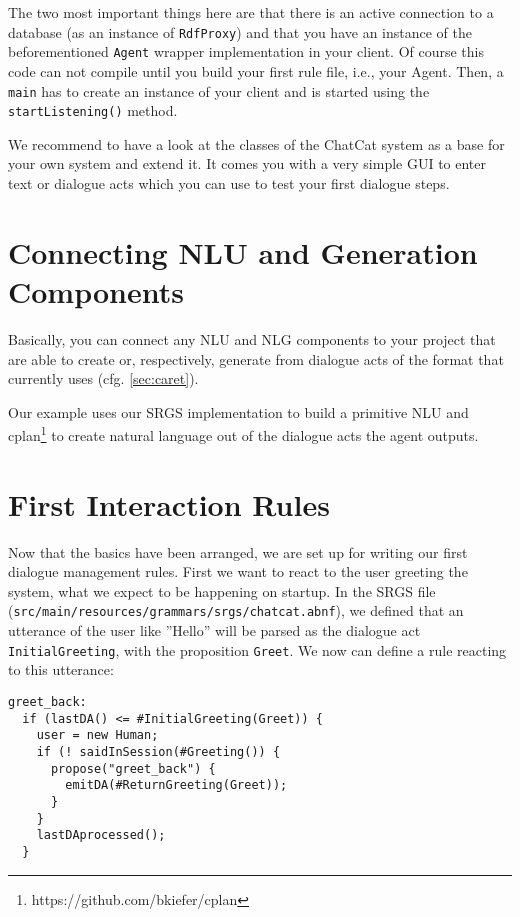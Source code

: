 The two most important things here are that there is an active connection to a
database (as an instance of \texttt{RdfProxy}) and that you have an instance of
the beforementioned \vonda \texttt{Agent} wrapper implementation in your
client. Of course this code can not compile until you build your first rule
file, i.e., your \vonda Agent. Then, a \texttt{main} has to create an instance
of your client and is started using the \texttt{startListening()} method.

We recommend to have a look at the classes of the ChatCat system as a base for
your own system and extend it. It comes you with a very simple GUI to enter
text or dialogue acts which you can use to test your first dialogue steps.

\section{Connecting NLU and Generation Components}

Basically, you can connect any NLU and NLG components to your project that are
able to create or, respectively, generate from dialogue acts of the format that
\vonda currently uses (cfg. \ref{sec:caret}).

Our example uses our SRGS implementation to build a primitive NLU and
cplan\footnote{https://github.com/bkiefer/cplan} to create natural
language out of the dialogue acts the agent outputs.

\section{First Interaction Rules}

Now that the basics have been arranged, we are set up for writing our first
dialogue management rules. First we want to react to the user greeting the
system, what we expect to be happening on startup. In the SRGS file
(\small\texttt{src/main/resources/grammars/srgs/chatcat.abnf}), we defined that
an utterance of the user like ''Hello'' will be parsed as the dialogue act
\texttt{InitialGreeting}, with the proposition \texttt{Greet}. We now can
define a rule reacting to this utterance:

\begin{lstlisting}
greet_back:
  if (lastDA() <= #InitialGreeting(Greet)) {
    user = new Human;
    if (! saidInSession(#Greeting()) {
      propose("greet_back") {
        emitDA(#ReturnGreeting(Greet));
      }
    }
    lastDAprocessed();
  }
\end{lstlisting}

